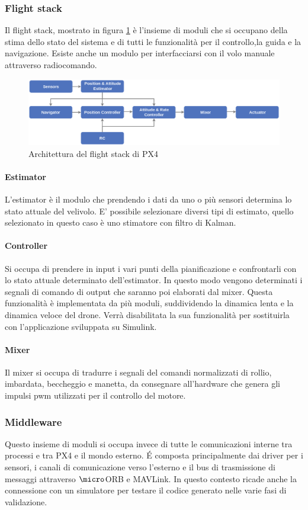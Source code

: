 \subsubsection{Flight stack}
Il flight stack, mostrato in figura \ref{fig:px4.flightstack} è l'insieme di moduli che si occupano della stima dello stato del sistema e di tutti le funzionalità per il controllo,la guida e la navigazione. Esiste anche un modulo per interfacciarsi con il volo manuale attraverso radiocomando.
	\begin{figure}[ht]
	\centering
	\includegraphics[width=1\textwidth]{SistemaQuadrirotore/Figure/PX4_High-Level_Flight-Stack}
	\caption{Architettura del flight stack di PX4}
	\label{fig:px4.flightstack}
\end{figure}
\paragraph{Estimator}
L'estimator è il modulo che prendendo i dati da uno o più sensori determina lo stato attuale del velivolo. E' possibile selezionare diversi tipi di estimato, quello selezionato in questo caso è uno stimatore con filtro di Kalman.
\paragraph{Controller}
Si occupa di prendere in input i vari punti della pianificazione e confrontarli con lo stato attuale determinato dell'estimator. In questo modo vengono determinati i segnali di comando di output che saranno poi elaborati dal mixer. Questa funzionalità è implementata da più moduli, suddividendo la dinamica lenta e la dinamica veloce del drone. Verrà disabilitata la sua funzionalità per sostituirla con l'applicazione sviluppata su Simulink.
\paragraph{Mixer}
Il mixer si occupa di tradurre i segnali del comandi normalizzati di rollio, imbardata, beccheggio e manetta, da consegnare all'hardware che genera gli impulsi pwm utilizzati per il controllo del motore.
\subsubsection{Middleware}
Questo insieme di moduli si occupa invece di tutte le comunicazioni interne tra processi e tra PX4 e il mondo esterno. \'E composta principalmente dai driver per i sensori, i canali di comunicazione verso l'esterno e il bus di trasmissione di messaggi attraverso $\micro$ORB e MAVLink. In questo contesto ricade anche  la connessione con un simulatore per testare il codice generato nelle varie fasi di validazione.
